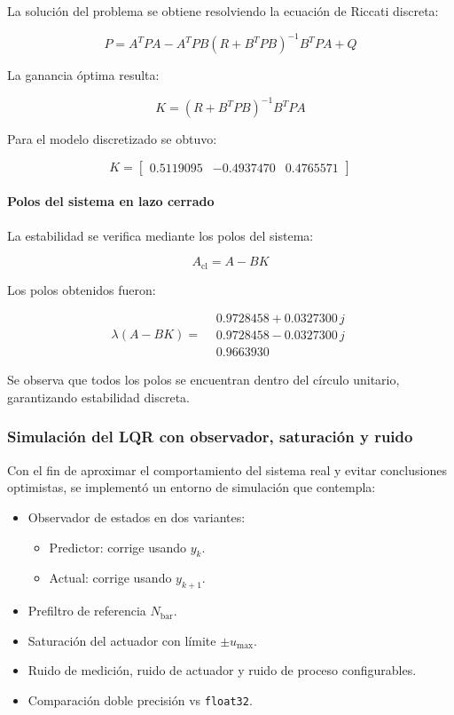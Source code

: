 La solución del problema se obtiene resolviendo la ecuación de Riccati discreta:

\[
P=A^TPA - A^TPB(R+B^TPB)^{-1}B^TPA + Q
\]

La ganancia óptima resulta:

\[
K=(R+B^TPB)^{-1}B^TPA
\]

Para el modelo discretizado se obtuvo:

\[
K=
\begin{bmatrix}
	0.5119095 & -0.4937470 & 0.4765571
\end{bmatrix}
\]

\paragraph{Polos del sistema en lazo cerrado}

La estabilidad se verifica mediante los polos del sistema:

\[
A_{\text{cl}} = A - BK
\]

Los polos obtenidos fueron:

\[
\lambda(A-BK)=
\begin{aligned}
	&0.9728458 + 0.0327300\,j\\
	&0.9728458 - 0.0327300\,j\\
	&0.9663930
\end{aligned}
\]

Se observa que todos los polos se encuentran dentro del círculo unitario,
garantizando estabilidad discreta.

\subsubsection{Simulación del LQR con observador, saturación y ruido}

Con el fin de aproximar el comportamiento del sistema real y evitar conclusiones
optimistas, se implementó un entorno de simulación que contempla:

\begin{itemize}
	\item Observador de estados en dos variantes:
	\begin{itemize}
		\item Predictor: corrige usando \(y_k\).
		\item Actual: corrige usando \(y_{k+1}\).
	\end{itemize}
	\item Prefiltro de referencia \(N_{\mathrm{bar}}\).
	\item Saturación del actuador con límite \(\pm u_{\max}\).
	\item Ruido de medición, ruido de actuador y ruido de proceso configurables.
	\item Comparación doble precisión vs \texttt{float32}.
\end{itemize}

